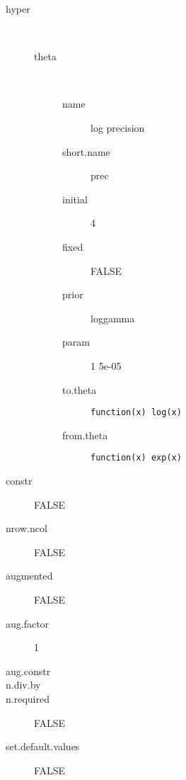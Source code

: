 \begin{description}
	\item[hyper]\ 
	 \begin{description}
	 	\item[theta]\ 
	 	 \begin{description}
	 	 	 \item[ name ] log precision 
	 	 	 \item[ short.name ] prec 
	 	 	 \item[ initial ] 4 
	 	 	 \item[ fixed ] FALSE 
	 	 	 \item[ prior ] loggamma 
	 	 	 \item[ param ] 1 5e-05 
	 	 	 \item[ to.theta ] \verb|function(x) log(x)| 
	 	 	 \item[ from.theta ] \verb|function(x) exp(x)| 
	 	 \end{description}
	 \end{description}
	 \item[ constr ] FALSE 
	 \item[ nrow.ncol ] FALSE 
	 \item[ augmented ] FALSE 
	 \item[ aug.factor ] 1 
	 \item[ aug.constr ]  
	 \item[ n.div.by ]  
	 \item[ n.required ] FALSE 
	 \item[ set.default.values ] FALSE 
\end{description}
